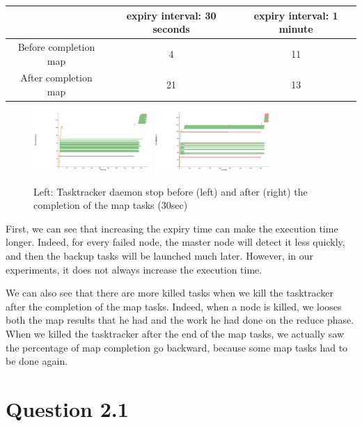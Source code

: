 \documentclass{article}
\begin{document}
\begin{center}
\begin{tabular}{|c|c|c|}
\hline
\ & expiry interval: 30 seconds & expiry interval: 1 minute \\
\hline
Before completion map & 4 & 11 \\
\hline
After completion map & 21 & 13 \\
\hline
\end{tabular}
\end{center}


\begin{figure}%
  \centering
  \includegraphics[width=0.4\textwidth]{expiry30before.png}
  \includegraphics[width=0.4\textwidth]{expiry30after.png}
  \caption{Left: Tasktracker daemon stop before (left) and after (right) the completion of the map tasks (30sec)}
  \label{kill}
\end{figure}


First, we can see that increasing the expiry time can make the execution time longer. Indeed, for every failed node, the master node will detect it less quickly, and then the backup tasks will be launched much later. However, in our experiments, it does not always increase the execution time.

We can also see that there are more killed tasks when we kill the tasktracker after the completion of the map tasks. Indeed, when a node is killed, we looses both the map results that he had and the work he had done on the reduce phase. When we killed the tasktracker after the end of the map tasks, we actually saw the percentage of map completion go backward, because some map tasks had to be done again.

\section*{Question 2.1}
\end{document}
